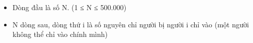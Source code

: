 \begin{itemize}
	\item     Dòng đầu là số N. (1 ≤ N ≤ 500.000)   
	\item     N dòng sau, dòng thứ i là số nguyên chỉ người bị người i chỉ vào (một người không thể chỉ vào chính mình)   
\end{itemize}